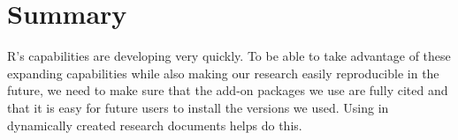 \section{Summary}

R's capabilities are developing very quickly. To be able to take advantage of these expanding capabilities while also making our research easily reproducible in the future, we need to make sure that the add-on packages we use are fully cited and that it is easy for future users to install the versions we used. Using  in dynamically created research documents helps do this. 



\address{Christopher Gandrud\\
  Hertie School of Governance\\
  Friedrichstra{\ss}e 180\\
  Berlin, 10117\\
  Germany} \\
